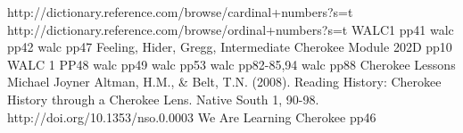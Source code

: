 

\begin{thebibliography}{99}
 http://dictionary.reference.com/browse/cardinal+numbers?s=t
 http://dictionary.reference.com/browse/ordinal+numbers?s=t
 WALC1 pp41
 walc pp42
 walc pp47
 Feeling, Hider, Gregg, Intermediate Cherokee Module 202D pp10
 WALC 1 PP48
 walc pp49
 walc pp53
 walc pp82-85,94
 walc pp88
 Cherokee Lessons Michael Joyner
 Altman, H.M., \& Belt, T.N. (2008). Reading History: Cherokee History through a Cherokee Lens. Native South 1, 90-98. http://doi.org/10.1353/nso.0.0003
 We Are Learning Cherokee pp46
\end{thebibliography}
